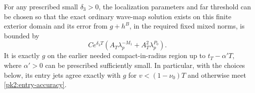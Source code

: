 \begin{proposition}
\label{pk2:exterior-proposition}
For any prescribed small $\delta_3>0$, the localization parameters
and far threshold can be chosen so that the exact ordinary
wave-map solution exists on this finite exterior domain and its
error from $g+h^B$, in the required fixed mixed norms, is bounded by
\begin{equation}
 C e^{\delta_3T}
       \left(A_T\lambda_p^{-M_1}+A_T^2\lambda_p^{P_0}\right).
 \tag{E3}\label{pk2:exterior-error}
\end{equation}
It is exactly $g$ on the earlier needed compact-in-radius region
up to $t_T-\alpha'T$, where $\alpha'>0$ can be prescribed
sufficiently small. In particular, with the choices below, its
entry jets agree exactly with $g$ for $v<(1-\nu_0)T$ and otherwise
meet \eqref{pk2:entry-accuracy}.
\end{proposition}
